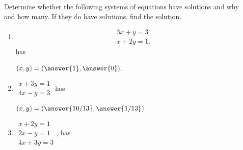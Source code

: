 \documentclass{ximera}
\author{Zack Reed}
\begin{document}
\begin{exercise}

Determine whether the following systems of equations have solutions and why and how many. If they do have solutions, find the solution.

\begin{enumerate}

\item  \begin{equation*}
    \begin{array}{c}
      3x+y=3 \\
      x+2y=1.
    \end{array}
  \end{equation*} has 

  \begin{selectAll}
  \end{selectAll}

  \begin{problem}
    $(x,y) = (\answer{1},\answer{0})$.
    \end{problem}

\item $
  \begin{array}{c}
    x+3y=1 \\
    4x-y=3
  \end{array}
  $ has

    \begin{selectAll}
    \end{selectAll}
  
  \begin{problem}
  
    $(x,y) = (\answer{10/13},\answer{1/13})$

  \end{problem}

\item $
\begin{array}{c}
    x+2y=1 \\
    2x-y=1 \\
    4x+3y=3
  \end{array}
  $, has
  
  \begin{selectAll}
    \end{selectAll}
  

\end{enumerate}
\end{exercise}
\end{document}
